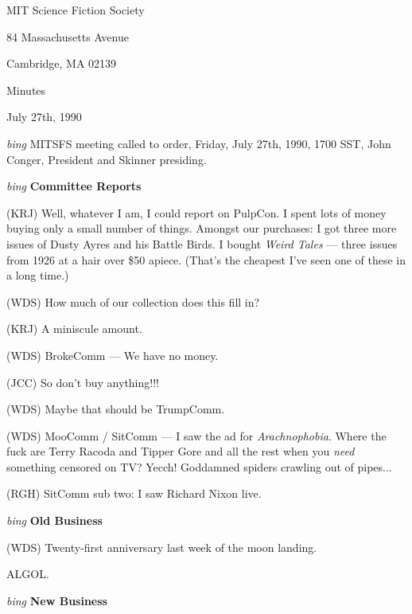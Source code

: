 \setlength{\topmargin}{-0.5in}
\setlength{\oddsidemargin}{0.0in}
\setlength{\evensidemargin}{0.0in}
\setlength{\textheight}{9in}
\setlength{\textwidth}{6.5in}



\begin{center}
MIT Science Fiction Society

84 Massachusetts Avenue

Cambridge, MA 02139

\vspace{0.2in}
Minutes

July 27th, 1990

\end{center}
 
\vspace{0.15in}
{\em bing\/}  MITSFS meeting called to order, Friday, July 27th, 1990,
1700 SST, John Conger, President and Skinner presiding.

{\em bing\/} {\bf Committee Reports\/}

(KRJ) Well, whatever I am, I could report on PulpCon.  I spent lots of money
buying only a small number of things.  Amongst our purchases: I got three more
issues of Dusty Ayres and his Battle Birds.  I bought {\em Weird Tales\/}
--- three issues from 1926 at a hair over \$50 apiece.  (That's the cheapest
I've seen one of these in a long time.)

(WDS) How much of our collection does this fill in?

(KRJ) A miniscule amount.

(WDS) BrokeComm --- We have no money.

(JCC) So don't buy anything!!!

(WDS) Maybe that should be TrumpComm.

(WDS) MooComm / SitComm --- I saw the ad for {\em Arachnophobia\/}.  Where the
fuck are Terry Racoda and Tipper Gore and all the rest when you {\em need\/}
something censored on TV?  Yecch!  Goddamned spiders crawling out of pipes...

(RGH) SitComm sub two: I saw Richard Nixon live.

\vspace{.15in}
{\em bing\/} {\bf Old Business\/}

(WDS) Twenty-first anniversary last week of the moon landing.

ALGOL.

\vspace{0.15in}
{\em bing\/} {\bf New Business\/}

